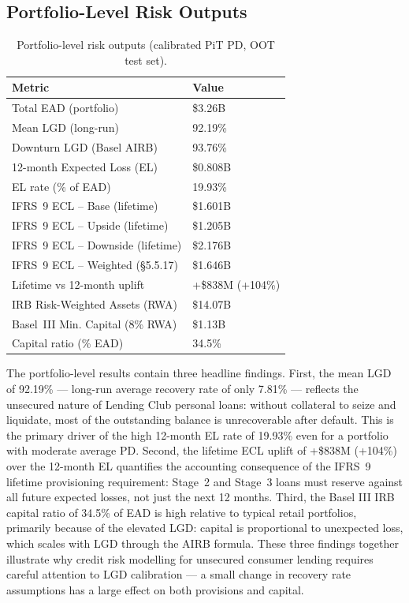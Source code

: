 \documentclass[12pt,a4paper]{report}
\begin{document}
\subsection{Portfolio-Level Risk Outputs}

\begin{table}[H]
\centering
\caption{Portfolio-level risk outputs (calibrated PiT PD, OOT test set).}
\label{tab:portfolio}
\begin{tabular}{ll}
\toprule
\textbf{Metric} & \textbf{Value} \\
\midrule
Total EAD (portfolio)            & \$3.26B \\
Mean LGD (long-run)              & 92.19\% \\
Downturn LGD (Basel AIRB)       & 93.76\% \\
12-month Expected Loss (EL)      & \$0.808B \\
EL rate (\% of EAD)              & 19.93\% \\
IFRS~9 ECL -- Base (lifetime)   & \$1.601B \\
IFRS~9 ECL -- Upside (lifetime) & \$1.205B \\
IFRS~9 ECL -- Downside (lifetime)& \$2.176B \\
IFRS~9 ECL -- Weighted (\S5.5.17)& \$1.646B \\
Lifetime vs 12-month uplift      & +\$838M (+104\%) \\
IRB Risk-Weighted Assets (RWA)   & \$14.07B \\
Basel~III Min. Capital (8\% RWA)& \$1.13B \\
Capital ratio (\% EAD)           & 34.5\% \\
\bottomrule
\end{tabular}
\end{table}

The portfolio-level results contain three headline findings. First, the mean LGD of 92.19\% --- long-run average recovery rate of only 7.81\% --- reflects the unsecured nature of Lending Club personal loans: without collateral to seize and liquidate, most of the outstanding balance is unrecoverable after default. This is the primary driver of the high 12-month EL rate of 19.93\% even for a portfolio with moderate average PD. Second, the lifetime ECL uplift of +\$838M (+104\%) over the 12-month EL quantifies the accounting consequence of the IFRS~9 lifetime provisioning requirement: Stage~2 and Stage~3 loans must reserve against all future expected losses, not just the next 12 months. Third, the Basel III IRB capital ratio of 34.5\% of EAD is high relative to typical retail portfolios, primarily because of the elevated LGD: capital is proportional to unexpected loss, which scales with LGD through the AIRB formula. These three findings together illustrate why credit risk modelling for unsecured consumer lending requires careful attention to LGD calibration --- a small change in recovery rate assumptions has a large effect on both provisions and capital.
\end{document}
